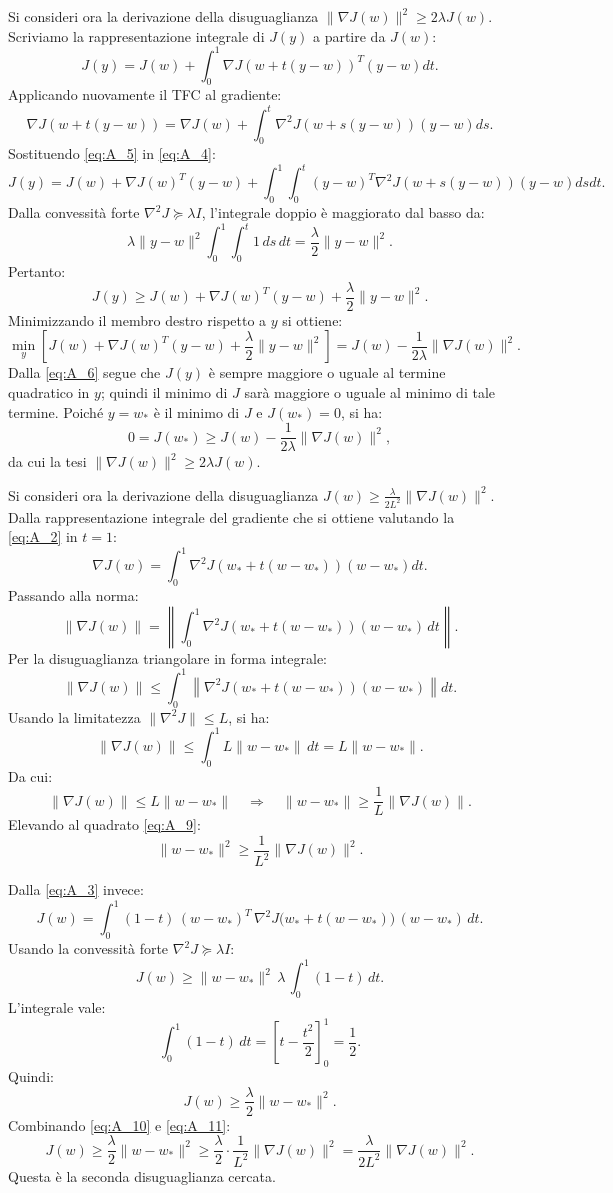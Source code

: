 \documentclass[a4paper,12pt]{article}
\numberwithin{equation}{section}
\numberwithin{figure}{section}
\numberwithin{table}{section}
\begin{document}
Si consideri ora la derivazione della disuguaglianza $\|\nabla J(w)\|^2 \geq 2\lambda J(w)$. Scriviamo la rappresentazione integrale di $J(y)$ a partire da $J(w)$:
\[
J(y) = J(w) + \int_0^1 \nabla J(w + t(y - w))^T (y - w) dt. \tag{A.4}\label{eq:A_4}
\]
Applicando nuovamente il TFC al gradiente:
\[
\nabla J(w + t(y - w)) = \nabla J(w) + \int_0^t \nabla^2 J(w + s(y - w))(y - w) ds. \tag{A.5}\label{eq:A_5}
\]
Sostituendo \eqref{eq:A_5} in \eqref{eq:A_4}:
\[
J(y) = J(w) + \nabla J(w)^T(y - w) + \int_0^1 \int_0^t (y - w)^T \nabla^2 J(w + s(y - w))(y - w) ds dt.
\]
Dalla convessità forte $\nabla^2 J \succeq \lambda I$, l'integrale doppio è maggiorato dal basso da:
\[
\lambda \|y - w\|^2 \int_0^1 \int_0^t 1 \, ds \, dt = \frac{\lambda}{2}\|y - w\|^2.
\]
Pertanto:
\[
J(y) \geq J(w) + \nabla J(w)^T(y - w) + \frac{\lambda}{2}\|y - w\|^2. \tag{A.6}\label{eq:A_6}
\]
Minimizzando il membro destro rispetto a $y$ si ottiene:
\[
\min_y \left[ J(w) + \nabla J(w)^T(y - w) + \frac{\lambda}{2}\|y - w\|^2 \right]
= J(w) - \frac{1}{2\lambda}\|\nabla J(w)\|^2.
\]
Dalla \eqref{eq:A_6} segue che $J(y)$ è sempre maggiore o uguale al termine quadratico in $y$; quindi il minimo di $J$ sarà maggiore o uguale al minimo di tale termine. Poiché $y = w_*$ è il minimo di $J$ e $J(w_*) = 0$, si ha:
\[
0 = J(w_*) \geq J(w) - \frac{1}{2\lambda}\|\nabla J(w)\|^2,
\]
da cui la tesi $\|\nabla J(w)\|^2 \geq 2\lambda J(w)$.

Si consideri ora la derivazione della disuguaglianza $J(w) \geq \frac{\lambda}{2L^2} \|\nabla J(w)\|^2$. Dalla rappresentazione integrale del gradiente che si ottiene valutando la \eqref{eq:A_2} in $t=1$:
\[
\nabla J(w) = \int_0^1 \nabla^2 J(w_* + t(w - w_*))(w - w_*) dt. \tag{A.7}\label{eq:A_7}
\]
Passando alla norma:
\[
\|\nabla J(w)\| 
= \left\| \int_0^1 \nabla^2 J(w_* + t(w - w_*))(w - w_*) \, dt \right\|.
\]
Per la disuguaglianza triangolare in forma integrale:
\[
\|\nabla J(w)\| 
\leq \int_0^1 \left\| \nabla^2 J(w_* + t(w - w_*))(w - w_*) \right\| dt.
\]
Usando la limitatezza $\|\nabla^2 J\| \leq L$, si ha:
\[
\|\nabla J(w)\| 
\leq \int_0^1 L \|w - w_*\| \, dt 
= L \|w - w_*\|. \tag{A.8}\label{eq:A_8}
\]
Da cui:
\[
\|\nabla J(w)\| \leq L \|w - w_*\| \quad \Longrightarrow \quad \|w - w_*\| \geq \frac{1}{L} \|\nabla J(w)\|. \tag{A.9}\label{eq:A_9}
\]
Elevando al quadrato \eqref{eq:A_9}:
\[
\|w - w_*\|^2 \geq \frac{1}{L^2} \|\nabla J(w)\|^2. \tag{A.10}\label{eq:A_10}
\]

Dalla \eqref{eq:A_3} invece:
\[
J(w) = \int_0^1 (1-t) \, (w - w_*)^T \, \nabla^2 J\bigl(w_* + t(w - w_*)\bigr) \, (w - w_*) \, dt.
\]
Usando la convessità forte $\nabla^2 J \succeq \lambda I$:
\[
J(w) \ge \|w - w_*\|^2 \, \lambda \, \int_0^1 (1-t) \, dt.
\]
L'integrale vale:
\[
\int_0^1 (1-t) \, dt = \left[t - \frac{t^2}{2}\right]_0^1 = \frac{1}{2}.
\]
Quindi:
\[
J(w) \geq \frac{\lambda}{2} \|w - w_*\|^2. \tag{A.11}\label{eq:A_11}
\]
Combinando \eqref{eq:A_10} e \eqref{eq:A_11}:
\[
J(w) \geq \frac{\lambda}{2} \|w - w_*\|^2 \geq \frac{\lambda}{2} \cdot \frac{1}{L^2} \|\nabla J(w)\|^2 = \frac{\lambda}{2L^2} \|\nabla J(w)\|^2.
\]
Questa è la seconda disuguaglianza cercata.
\end{document}
